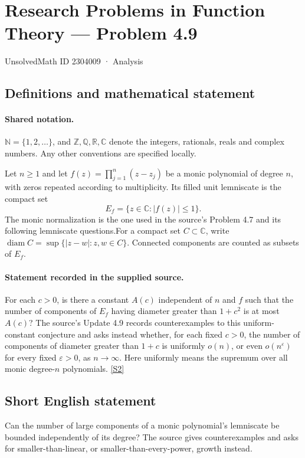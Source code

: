 \documentclass[11pt]{book}
\newcommand{\sref}[2]{\hyperlink{source:#1:#2}{[S#2]}}
\begin{document}
\setcounter{section}{2304008}
\section{Research Problems in Function Theory — Problem 4.9}\label{2304009}
{\small\sffamily UnsolvedMath ID 2304009 · Analysis}
\subsection{Definitions and mathematical statement}

\paragraph{Shared notation.}$\mathbb N=\{1,2,\ldots\}$, and $\mathbb Z,\mathbb Q,\mathbb R,\mathbb C$ denote the integers, rationals, reals and complex numbers. Any other conventions are specified locally.


Let $n\ge1$ and let $f(z)=\prod_{j=1}^n(z-z_j)$ be a monic polynomial of degree $n$, with zeros repeated according to multiplicity. Its filled unit lemniscate is the compact set
\[E_f=\{z\in\mathbb C:|f(z)|\le1\}.
\]
The monic normalization is the one used in the source's Problem 4.7 and its following lemniscate questions.For a compact set $C\subset\mathbb C$, write $\operatorname{diam}C=\sup\{|z-w|:z,w\in C\}$. Connected components are counted as subsets of $E_f$.
\paragraph{Statement recorded in the supplied source.}
For each $c>0$, is there a constant $A(c)$ independent of $n$ and $f$ such that the number of components of $E_f$ having diameter greater than $1+c^2$ is at most $A(c)$? The source's Update 4.9 records counterexamples to this uniform-constant conjecture and asks instead whether, for each fixed $c>0$, the number of components of diameter greater than $1+c$ is uniformly $o(n)$, or even $o(n^\varepsilon)$ for every fixed $\varepsilon>0$, as $n\to\infty$. Here uniformly means the supremum over all monic degree-$n$ polynomials. \sref{2304009}{2}
\subsection{Short English statement}
Can the number of large components of a monic polynomial’s lemniscate be bounded independently of its degree? The source gives counterexamples and asks for smaller-than-linear, or smaller-than-every-power, growth instead.
\end{document}
